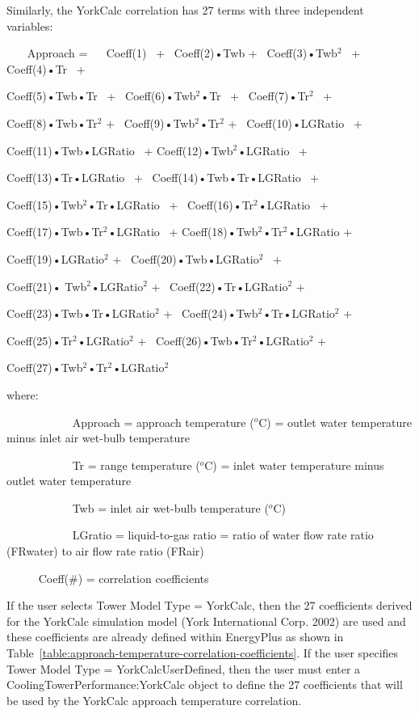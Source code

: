 Similarly, the YorkCalc correlation has 27 terms with three independent variables:

~~~ Approach = ~~ Coeff(1)~ +~ Coeff(2)•Twb +~ Coeff(3)•Twb\(^{2}\)~ +~ Coeff(4)•Tr~ +

Coeff(5)•Twb•Tr~ +~ Coeff(6)•Twb\(^{2}\)•Tr~ +~ Coeff(7)•Tr\(^{2}\)~ +

Coeff(8)•Twb•Tr\(^{2}\) +~ Coeff(9)•Twb\(^{2}\)•Tr\(^{2}\) +~ Coeff(10)•LGRatio~ +

Coeff(11)•Twb•LGRatio~ + Coeff(12)•Twb\(^{2}\)•LGRatio~ +

Coeff(13)•Tr•LGRatio~ +~ Coeff(14)•Twb•Tr•LGRatio~ +

Coeff(15)•Twb\(^{2}\)•Tr•LGRatio~ +~ Coeff(16)•Tr\(^{2}\)•LGRatio~ +

Coeff(17)•Twb•Tr\(^{2}\)•LGRatio~ + Coeff(18)•Twb\(^{2}\)•Tr\(^{2}\)•LGRatio +

Coeff(19)•LGRatio\(^{2}\) +~ Coeff(20)•Twb•LGRatio\(^{2}\)~ +

Coeff(21)• Twb\(^{2}\)•LGRatio\(^{2}\) +~ Coeff(22)•Tr•LGRatio\(^{2}\) +

Coeff(23)•Twb•Tr•LGRatio\(^{2}\) +~ Coeff(24)•Twb\(^{2}\)•Tr•LGRatio\(^{2}\) +

Coeff(25)•Tr\(^{2}\)•LGRatio\(^{2}\) +~ Coeff(26)•Twb•Tr\(^{2}\)•LGRatio\(^{2}\) +

Coeff(27)•Twb\(^{2}\)•Tr\(^{2}\)•LGRatio\(^{2}\)

where:

~~~~~~~~~~~ Approach = approach temperature (\(^{o}\)C) = outlet water temperature minus inlet air wet-bulb temperature

~~~~~~~~~~~ Tr = range temperature (\(^{o}\)C) = inlet water temperature minus outlet water temperature

~~~~~~~~~~~ Twb = inlet air wet-bulb temperature (\(^{o}\)C)

~~~~~~~~~~~ LGratio = liquid-to-gas ratio = ratio of water flow rate ratio (FRwater) to air flow rate ratio (FRair)

~~~~~ Coeff(\#) = correlation coefficients

If the user selects Tower Model Type = YorkCalc, then the 27 coefficients derived for the YorkCalc simulation model (York International Corp. 2002) are used and these coefficients are already defined within EnergyPlus as shown in Table~\ref{table:approach-temperature-correlation-coefficients}. If the user specifies Tower Model Type = YorkCalcUserDefined, then the user must enter a CoolingTowerPerformance:YorkCalc object to define the 27 coefficients that will be used by the YorkCalc approach temperature correlation.

